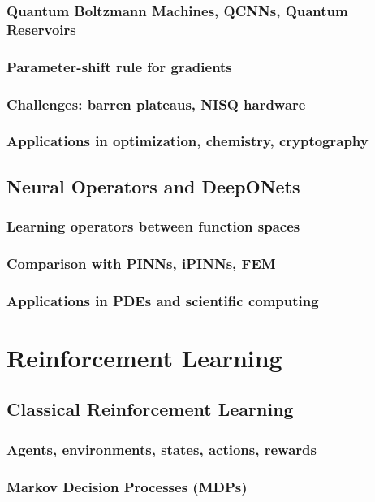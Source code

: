 \section{Quantum Boltzmann Machines, QCNNs, Quantum Reservoirs}
\section{Parameter-shift rule for gradients}
\section{Challenges: barren plateaus, NISQ hardware}
\section{Applications in optimization, chemistry, cryptography}

\chapter{Neural Operators and DeepONets}
\section{Learning operators between function spaces}
\section{Comparison with PINNs, iPINNs, FEM}
\section{Applications in PDEs and scientific computing}

\part{Reinforcement Learning}

\chapter{Classical Reinforcement Learning}
\section{Agents, environments, states, actions, rewards}
\section{Markov Decision Processes (MDPs)}
